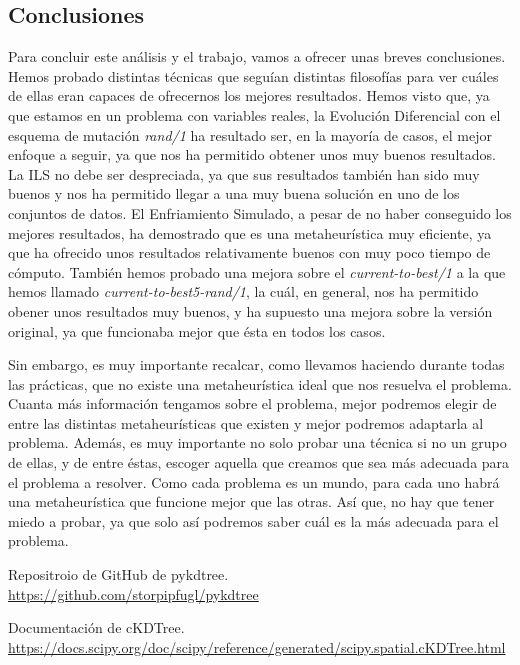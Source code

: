 \documentclass[11pt,a4paper]{article}
\begin{document}
\subsection{Conclusiones}

Para concluir este análisis y el trabajo, vamos a ofrecer unas breves conclusiones. Hemos probado distintas técnicas que seguían
distintas filosofías para ver cuáles de ellas eran capaces de ofrecernos los mejores resultados. Hemos visto que, ya que estamos
en un problema con variables reales, la Evolución Diferencial con el esquema de mutación \textit{rand/1} ha resultado ser, en la 
mayoría de casos, el mejor enfoque a seguir, ya que nos ha permitido obtener unos muy buenos resultados. La ILS no debe ser
despreciada, ya que sus resultados también han sido muy buenos y nos ha permitido llegar a una muy buena solución en uno de los
conjuntos de datos. El Enfriamiento Simulado, a pesar de no haber conseguido los mejores resultados, ha demostrado que es una
metaheurística muy eficiente, ya que ha ofrecido unos resultados relativamente buenos con muy poco tiempo de cómputo. También
hemos probado una mejora sobre el \textit{current-to-best/1} a la que hemos llamado \textit{current-to-best5-rand/1}, la cuál,
en general, nos ha permitido obener unos resultados muy buenos, y ha supuesto una mejora sobre la versión original, ya que funcionaba
mejor que ésta en todos los casos.

Sin embargo, es muy importante recalcar, como llevamos haciendo durante todas las prácticas, que no existe una metaheurística ideal
que nos resuelva el problema. Cuanta más información tengamos sobre el problema, mejor podremos elegir de entre las distintas
metaheurísticas que existen y mejor podremos adaptarla al problema. Además, es muy importante no solo probar una técnica si no un
grupo de ellas, y de entre éstas, escoger aquella que creamos que sea más adecuada para el problema a resolver. Como cada problema
es un mundo, para cada uno habrá una metaheurística que funcione mejor que las otras. Así que, no hay que tener miedo a probar, ya
que solo así podremos saber cuál es la más adecuada para el problema.

\newpage

\begin{thebibliography}{5}

Repositroio de GitHub de pykdtree.
\\\url{https://github.com/storpipfugl/pykdtree}

Documentación de cKDTree.
\\\url{https://docs.scipy.org/doc/scipy/reference/generated/scipy.spatial.cKDTree.html}

\end{thebibliography}
\end{document}
